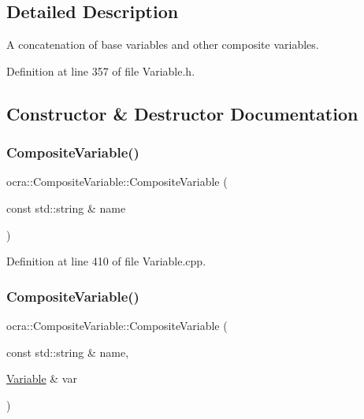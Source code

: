 \subsection{Detailed Description}
A concatenation of base variables and other composite variables. 

Definition at line 357 of file Variable.\+h.



\subsection{Constructor \& Destructor Documentation}
\hypertarget{classocra_1_1CompositeVariable_a1611f9c8b278c183ca68837e0b91f4f0}{}\label{classocra_1_1CompositeVariable_a1611f9c8b278c183ca68837e0b91f4f0} 
\subsubsection{\texorpdfstring{Composite\+Variable()}{CompositeVariable()}\hspace{0.1cm}{\footnotesize\ttfamily [1/4]}}
{\footnotesize\ttfamily ocra\+::\+Composite\+Variable\+::\+Composite\+Variable (\begin{DoxyParamCaption}\item[{const std\+::string \&}]{name }\end{DoxyParamCaption})}



Definition at line 410 of file Variable.\+cpp.

\hypertarget{classocra_1_1CompositeVariable_a131e1ee2f3b4dcd3439b8eb389777f81}{}\label{classocra_1_1CompositeVariable_a131e1ee2f3b4dcd3439b8eb389777f81} 
\subsubsection{\texorpdfstring{Composite\+Variable()}{CompositeVariable()}\hspace{0.1cm}{\footnotesize\ttfamily [2/4]}}
{\footnotesize\ttfamily ocra\+::\+Composite\+Variable\+::\+Composite\+Variable (\begin{DoxyParamCaption}\item[{const std\+::string \&}]{name,  }\item[{\hyperlink{classocra_1_1Variable}{Variable} \&}]{var }\end{DoxyParamCaption})}




